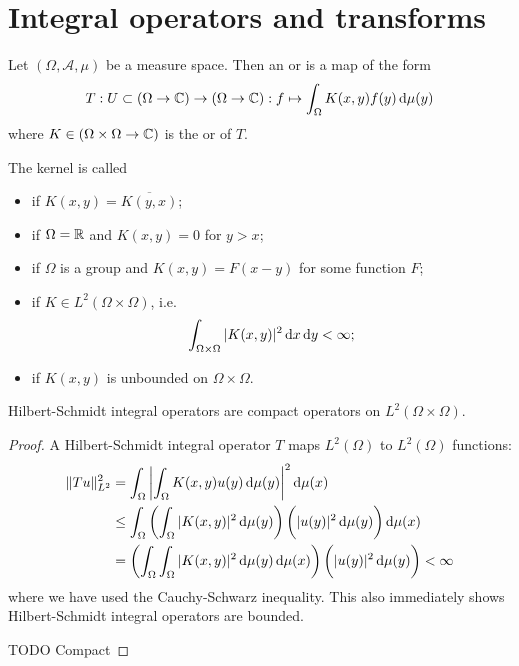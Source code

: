 \section{Integral operators and transforms}
\begin{definition}
Let $(\Omega, \mathcal{A}, \mu)$ be a measure space. Then an  or  is a map of the form
\[ T: U\subset (\Omega\to\mathbb{C}) \to (\Omega\to\mathbb{C}): f \mapsto \int_\Omega K(x,y)f(y) \operatorname{d \!}{\mu(y)} \]
where $K\in (\Omega\times \Omega \to \mathbb{C})$ is the  or  of $T$.

The kernel is called
\begin{itemize}
\item {} if $K(x,y) = \overline{K(y,x)}$;
\item {} if $\Omega = \mathbb{R}$ and $K(x,y) = 0$ for $y>x$;
\item {} if $\Omega$ is a group and $K(x,y) = F(x-y)$ for some function $F$;
\item {} if $K\in L^2(\Omega\times \Omega)$, i.e.\
\[ \int_{\Omega\times \Omega}|K(x,y)|^2\operatorname{d \!}{x}\operatorname{d \!}{y} < \infty; \]
\item \udef{singular} if $K(x,y)$ is unbounded on $\Omega\times \Omega$.
\end{itemize}
\end{definition}

\begin{lemma}
Hilbert-Schmidt integral operators are compact operators on $L^2(\Omega\times \Omega)$.
\end{lemma}
\begin{proof}
A Hilbert-Schmidt integral operator $T$ maps $L^2(\Omega)$ to $L^2(\Omega)$ functions:
\begin{align*}
\norm{Tu}^2_{L^2} &= \int_\Omega \left|\int_{\Omega} K(x,y)u(y)\diff{\mu(y)}\right|^2\diff{\mu(x)} \\
&\leq \int_\Omega \left(\int_{\Omega} |K(x,y)|^2\diff{\mu(y)}\right) \bigg( |u(y)|^2\diff{\mu(y)}\bigg)\diff{\mu(x)} \\
&= \left(\int_\Omega \int_{\Omega} |K(x,y)|^2\diff{\mu(y)}\diff{\mu(x)}\right) \bigg( |u(y)|^2\diff{\mu(y)}\bigg) < \infty
\end{align*}
where we have used the Cauchy-Schwarz inequality. This also immediately shows Hilbert-Schmidt integral operators are bounded.

TODO Compact
\end{proof}


